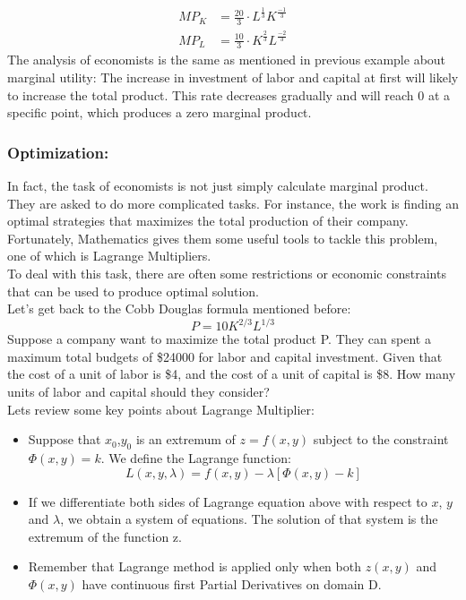\documentclass[a4paper]{article}
\begin{document}
\begin{align*}
	MP_K & = \frac{20}{3} \cdot L^{\frac{1}{3}} K^{\frac{-1}{3}} \\
	MP_L & = \frac{10}{3} \cdot K^{\frac{2}{3}} L^{\frac{-2}{3}}
\end{align*}
The analysis of economists is the same as mentioned in previous example about marginal utility: The increase in investment of labor and capital at first will likely to increase the total product. This rate decreases gradually and will reach 0 at a specific point, which produces a zero marginal product. \\
\subsubsection*{Optimization:}
In fact, the task of economists is not just simply calculate marginal product. They are asked to do more complicated tasks. For instance, the work is finding an optimal strategies that maximizes the total production of their company. \\
Fortunately, Mathematics gives them some useful tools to tackle this problem, one of which is Lagrange Multipliers. \\
To deal with this task, there are often some restrictions or economic constraints that can be used to produce optimal solution.\\
Let’s get back to the Cobb Douglas formula mentioned before:
\begin{equation*}
	P = 10K^{2/3}L^{1/3}
\end{equation*}
Suppose a company want to maximize the total product P. They can spent a maximum total budgets of \$24000 for labor and capital investment. Given that the cost of a unit of labor is \$4, and the cost of a unit of capital is \$8.  How many units of labor and capital should they consider? \\
Lets review some key points about Lagrange Multiplier: \\
\begin{itemize}
	\item Suppose that $x_0$,$y_0$ is an extremum of $z = f(x,y)$ subject to the constraint $\Phi(x,y) = k$. We define the Lagrange function:
	      \begin{equation*}
		      L(x,y,\lambda) = f(x,y) - \lambda[\Phi(x,y) - k]
	      \end{equation*}
	\item If we differentiate both sides of Lagrange equation above with respect to $x$, $y$ and $\lambda$, we obtain a system of equations. The solution of that system is the extremum of the function z.
	\item Remember that Lagrange method is applied only when both $z(x,y)$ and $\Phi(x,y)$ have continuous first Partial Derivatives on domain D.
\end{itemize}
\end{document}
